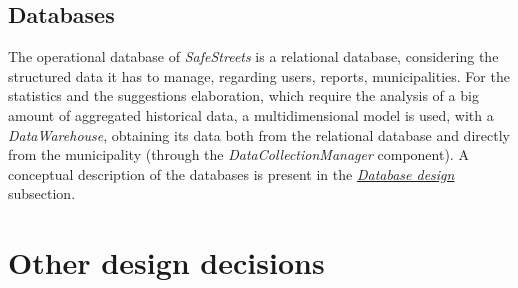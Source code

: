\documentclass[a4paper]{report}
\begin{document}
\subsection{Databases}
The operational database of \textit{SafeStreets} is a relational database, considering the structured data it has to manage, regarding users, reports, municipalities. For the statistics and the suggestions elaboration, which require the analysis of a big amount of aggregated historical data, a multidimensional model is used, with a \textit{DataWarehouse}, obtaining its data both from the relational database and directly from the municipality (through the \textit{DataCollectionManager} component). A conceptual description of the databases is present in the \hyperref[sec:db-design]{\textit{Database design}} subsection.
 

\section{Other design decisions}
\end{document}
